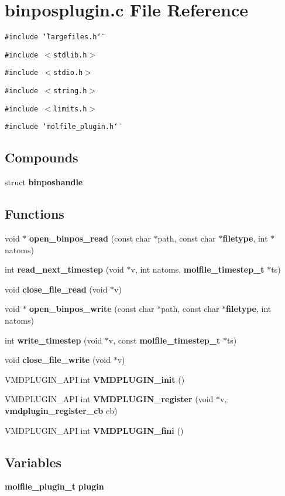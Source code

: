\section{binposplugin.c File Reference}
\label{binposplugin_8c}
{\tt \#include \char`\"{}largefiles.h\char`\"{}}\par
{\tt \#include $<$stdlib.h$>$}\par
{\tt \#include $<$stdio.h$>$}\par
{\tt \#include $<$string.h$>$}\par
{\tt \#include $<$limits.h$>$}\par
{\tt \#include \char`\"{}molfile\_\-plugin.h\char`\"{}}\par
\subsection*{Compounds}
\begin{CompactItemize}
\item 
struct {\bf binposhandle}
\end{CompactItemize}
\subsection*{Functions}
\begin{CompactItemize}
\item 
void $\ast$ {\bf open\_\-binpos\_\-read} (const char $\ast$path, const char $\ast${\bf filetype}, int $\ast$natoms)
\item 
int {\bf read\_\-next\_\-timestep} (void $\ast$v, int natoms, {\bf molfile\_\-timestep\_\-t} $\ast$ts)
\item 
void {\bf close\_\-file\_\-read} (void $\ast$v)
\item 
void $\ast$ {\bf open\_\-binpos\_\-write} (const char $\ast$path, const char $\ast${\bf filetype}, int natoms)
\item 
int {\bf write\_\-timestep} (void $\ast$v, const {\bf molfile\_\-timestep\_\-t} $\ast$ts)
\item 
void {\bf close\_\-file\_\-write} (void $\ast$v)
\item 
VMDPLUGIN\_\-API int {\bf VMDPLUGIN\_\-init} ()
\item 
VMDPLUGIN\_\-API int {\bf VMDPLUGIN\_\-register} (void $\ast$v, {\bf vmdplugin\_\-register\_\-cb} cb)
\item 
VMDPLUGIN\_\-API int {\bf VMDPLUGIN\_\-fini} ()
\end{CompactItemize}
\subsection*{Variables}
\begin{CompactItemize}
\item 
{\bf molfile\_\-plugin\_\-t} {\bf plugin}
\end{CompactItemize}


